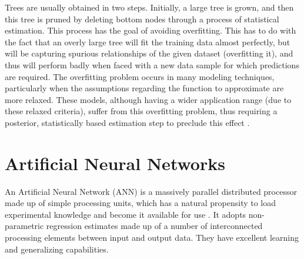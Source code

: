 Trees are usually obtained in two steps. Initially, a large tree is grown, and then this tree is pruned by deleting bottom nodes through a process of statistical estimation. This process has the goal of avoiding overfitting. This has to do with the fact that an overly large tree will fit the training data almost perfectly, but will be capturing spurious relationships of the given dataset (overfitting it), and thus will perform badly when faced with a new data sample for which predictions are required. The overfitting problem occurs in many modeling techniques, particularly when the assumptions regarding the function to approximate are more relaxed. These models, although having a wider application range (due to these relaxed criteria), suffer from this overfitting problem, thus requiring a posterior, statistically based estimation step to preclude this effect \cite{torgo2003data}.

\section{Artificial Neural Networks}

An Artificial Neural Network (ANN) is a massively parallel distributed processor made up of simple processing units, which has a natural propensity to load experimental knowledge and become it available for use  \cite{linlee1996neuralfuzzy}. It adopts non-parametric regression estimates made up of a number of interconnected processing elements between input and output data. They have excellent learning and generalizing capabilities.

